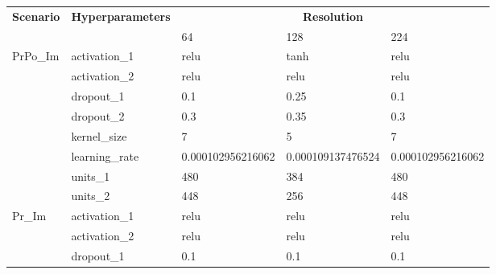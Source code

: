 \documentclass[Journal,letterpaper, SingleSpace, InsideFigs]{ascelike-new}
\begin{document}
\begin{table}[h!]\small
    \centering
\begin{tabular}{@{}lllll@{}}
\toprule
\multirow{2}{*}{\textbf{Scenario}} & \multirow{2}{*}{\textbf{Hyperparameters}} & \multicolumn{3}{c}{\textbf{Resolution}} \\ \cmidrule(l){3-5} 
                            &                & 64                & 128               & 224               \\ \midrule
\multirow{8}{*}{PrPo\_Im}   & activation\_1  & relu              & tanh              & relu              \\
                            & activation\_2  & relu              & relu              & relu              \\
                            & dropout\_1     & 0.1               & 0.25              & 0.1               \\
                            & dropout\_2     & 0.3               & 0.35              & 0.3               \\
                            & kernel\_size   & 7                 & 5                 & 7                 \\
                            & learning\_rate & \num{0.000102956216062} & \num{0.000109137476524} & \num{0.000102956216062} \\
                            & units\_1       & 480               & 384               & 480               \\
                            & units\_2       & 448               & 256               & 448               \\\midrule
\multirow{8}{*}{Pr\_Im}     & activation\_1  & relu              & relu              & relu              \\
                            & activation\_2  & relu              & relu              & relu              \\
                            & dropout\_1     & 0.1               & 0.1               & 0.1               \\

\end{tabular}
\end{table}
\end{document}
